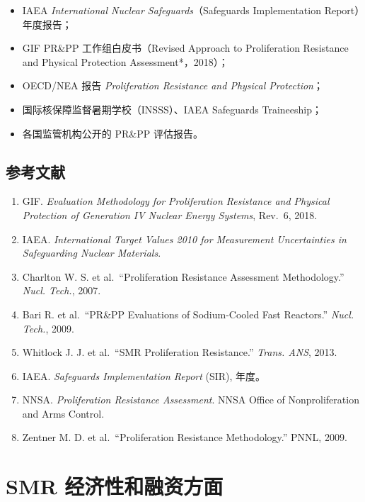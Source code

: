 \documentclass[
  UTF8,
  scheme=plain,
  fontsize=10pt,
  openany
]{ctexbook}
\begin{document}
\begin{itemize}
\tightlist
\item
  IAEA \emph{International Nuclear Safeguards}（Safeguards
  Implementation Report）年度报告；
\item
  GIF PR\&PP 工作组白皮书（Revised Approach to Proliferation Resistance
  and Physical Protection Assessment*，2018）；
\item
  OECD/NEA 报告 \emph{Proliferation Resistance and Physical
  Protection}；
\item
  国际核保障监督暑期学校（INSSS）、IAEA Safeguards Traineeship；
\item
  各国监管机构公开的 PR\&PP 评估报告。
\end{itemize}

\section{参考文献}\label{ux53c2ux8003ux6587ux732e-8}

\begin{enumerate}
\def\labelenumi{\arabic{enumi}.}
\tightlist
\item
  GIF. \emph{Evaluation Methodology for Proliferation Resistance and
  Physical Protection of Generation IV Nuclear Energy Systems}, Rev.~6,
  2018.
\item
  IAEA. \emph{International Target Values 2010 for Measurement
  Uncertainties in Safeguarding Nuclear Materials}.
\item
  Charlton W. S. et al.~``Proliferation Resistance Assessment
  Methodology.'' \emph{Nucl. Tech.}, 2007.
\item
  Bari R. et al.~``PR\&PP Evaluations of Sodium-Cooled Fast Reactors.''
  \emph{Nucl. Tech.}, 2009.
\item
  Whitlock J. J. et al.~``SMR Proliferation Resistance.'' \emph{Trans.
  ANS}, 2013.
\item
  IAEA. \emph{Safeguards Implementation Report} (SIR), 年度。
\item
  NNSA. \emph{Proliferation Resistance Assessment}. NNSA Office of
  Nonproliferation and Arms Control.
\item
  Zentner M. D. et al.~``Proliferation Resistance Methodology.'' PNNL,
  2009.
\end{enumerate}

\cleardoublepage

\chapter{SMR
经济性和融资方面}\label{smr-ux7ecfux6d4eux6027ux548cux878dux8d44ux65b9ux9762}
\end{document}
